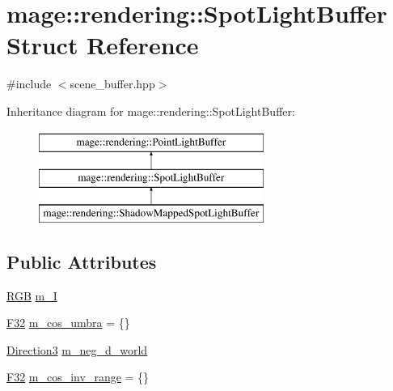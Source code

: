 \hypertarget{structmage_1_1rendering_1_1_spot_light_buffer}{}\section{mage\+:\+:rendering\+:\+:Spot\+Light\+Buffer Struct Reference}
\label{structmage_1_1rendering_1_1_spot_light_buffer}


{\ttfamily \#include $<$scene\+\_\+buffer.\+hpp$>$}

Inheritance diagram for mage\+:\+:rendering\+:\+:Spot\+Light\+Buffer\+:\begin{figure}[H]
\begin{center}
\leavevmode
\includegraphics[height=3.000000cm]{structmage_1_1rendering_1_1_spot_light_buffer}
\end{center}
\end{figure}
\subsection*{Public Attributes}
\begin{DoxyCompactItemize}
\item 
\mbox{\hyperlink{structmage_1_1_r_g_b}{R\+GB}} \mbox{\hyperlink{structmage_1_1rendering_1_1_spot_light_buffer_ab67a7ecde450e0096563c4be789156c9}{m\+\_\+I}}
\item 
\mbox{\hyperlink{namespacemage_aa97e833b45f06d60a0a9c4fc22ae02c0}{F32}} \mbox{\hyperlink{structmage_1_1rendering_1_1_spot_light_buffer_afa3c23903a4b31bf6b7da537d7f9b660}{m\+\_\+cos\+\_\+umbra}} = \{\}
\item 
\mbox{\hyperlink{structmage_1_1_direction3}{Direction3}} \mbox{\hyperlink{structmage_1_1rendering_1_1_spot_light_buffer_a66c4eccce12de2ee271877665eb3c3a3}{m\+\_\+neg\+\_\+d\+\_\+world}}
\item 
\mbox{\hyperlink{namespacemage_aa97e833b45f06d60a0a9c4fc22ae02c0}{F32}} \mbox{\hyperlink{structmage_1_1rendering_1_1_spot_light_buffer_a80c169b3f3e87c7d91a7b2b4473e4136}{m\+\_\+cos\+\_\+inv\+\_\+range}} = \{\}
\end{DoxyCompactItemize}


